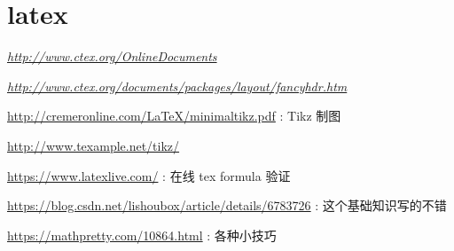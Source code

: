 
\section{latex}

\textsl{\url{http://www.ctex.org/OnlineDocuments}}

\textsl{\url{http://www.ctex.org/documents/packages/layout/fancyhdr.htm}}

\url{http://cremeronline.com/LaTeX/minimaltikz.pdf} : Tikz 制图

\url{http://www.texample.net/tikz/}

\url{https://www.latexlive.com/} : 在线 tex formula 验证

\url{https://blog.csdn.net/lishoubox/article/details/6783726} : 这个基础知识写的不错

\url{https://mathpretty.com/10864.html} : 各种小技巧







